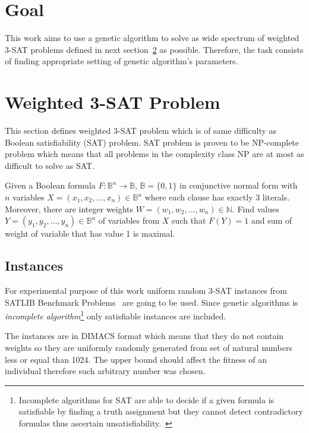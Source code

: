 \documentclass{article}
\begin{document}
\section{Goal}

This work aims to use a genetic algorithm to solve as wide spectrum of
weighted 3-SAT problems defined in next section~\ref{problem} as possible.
Therefore, the task consists of finding appropriate setting of genetic
algorithm's parameters.

\section{Weighted 3-SAT Problem}
\label{problem}

This section defines weighted 3-SAT problem which is of same difficulty
as Boolean satisfiability (SAT) problem.
SAT problem is proven to be NP-complete problem
which means that all problems in the complexity class NP are at most
as difficult to solve as SAT.~\cite{cook1971}

Given a Boolean formula $F: \mathbb{B}^n \to \mathbb{B}$,
$\mathbb{B} = \{0, 1\}$ in conjunctive normal form with $n$ variables
$X = (x_1, x_2, \dots, x_n) \in \mathbb{B}^n$
where each clause has exactly 3 literals.
Moreover, there are integer weights
$W = (w_1, w_2, \dots, w_n) \in \mathbb{N}$.
Find values $Y = (y_1, y_2, \dots, y_n) \in \mathbb{B}^n$ of variables from $X$
such that $F(Y) = 1$
and sum of weight of variable that has value 1 is maximal.

\subsection{Instances}

For experimental purpose of this work uniform random 3-SAT instances
from SATLIB Benchmark Problems~\cite{hoos2000} are going to be used.
Since genetic algorithms is \textit{incomplete algorithm}\footnote{Incomplete
algorithms for SAT are able to decide if a given formula is satisfiable by
finding a truth assignment
but they cannot detect contradictory formulas
thus ascertain unsatisfiability.~\cite{ellerweg2004}}
only satisfiable instances are included.

The instances are in DIMACS format
which means that they do not contain weights so they are uniformly randomly
generated from set of natural numbers less or equal than 1024.
The upper bound should affect the fitness of an individual
therefore such arbitrary number was chosen.
\end{document}
